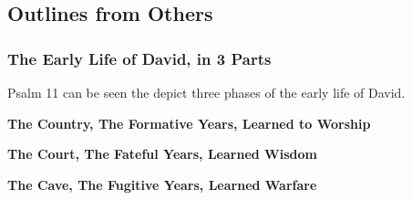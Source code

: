 \subsection{Outlines from Others}

\subsubsection{The Early Life of David, in 3 Parts}
Psalm 11 can be seen the depict three phases of the early life of David.%
\begin{compactenum}[I.]
    \item \textbf{The Country, The Formative Years, Learned to Worship} 
    \item \textbf{The Court, The Fateful Years, Learned Wisdom} 
    \item \textbf{The Cave, The Fugitive Years, Learned Warfare} 
\end{compactenum}

